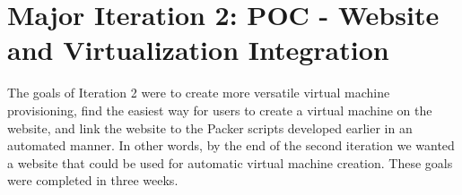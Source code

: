 \documentclass[openright]{report}
\begin{document}
\section{Major Iteration 2: POC -  Website and Virtualization Integration}
\par The goals of Iteration 2 were to create more versatile virtual machine provisioning, find the easiest way for users to create a virtual machine on the website, and link the website to the Packer scripts developed earlier in an automated manner. In other words, by the end of the second iteration we wanted a website that could be used for automatic virtual machine creation. These goals were completed in three weeks.
\end{document}

